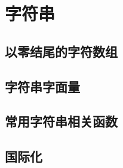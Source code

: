 
\section{字符串}

\subsection{以零结尾的字符数组}

\subsection{字符串字面量}

\subsection{常用字符串相关函数}

\subsection{国际化}

\pagebreak